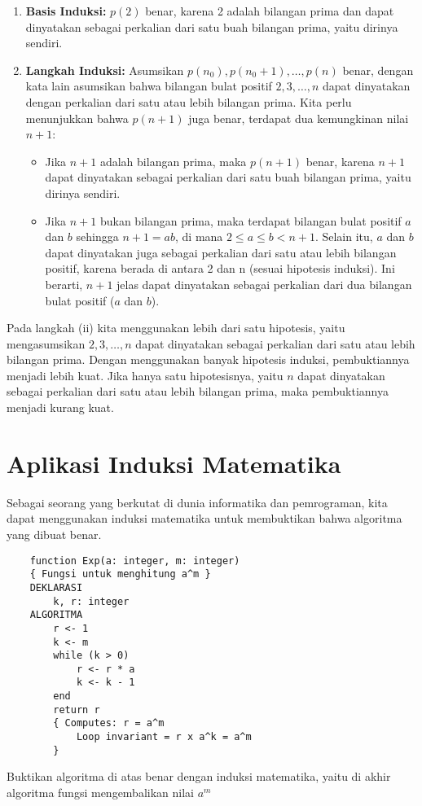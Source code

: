 \documentclass[11pt]{article}
\theoremstyle{definitionstyle}
\theoremstyle{theoremstyle}
\theoremstyle{examplestyle}
\begin{document}
\begin{enumerate}[left=0pt, itemsep=1.5pt, topsep=1.5pt, label=\roman*), leftmargin=1.5em]
    \item \textbf{Basis Induksi:} $p(2)$ benar, karena 2 adalah bilangan prima dan dapat dinyatakan sebagai perkalian dari satu buah bilangan prima, yaitu dirinya sendiri.
    \item \textbf{Langkah Induksi: } Asumsikan $p(n_0), p(n_0 + 1), \dots, p(n)$ benar, dengan kata lain asumsikan bahwa bilangan bulat positif $2, 3, \dots, n$ dapat dinyatakan dengan perkalian dari satu atau lebih bilangan prima. Kita perlu menunjukkan bahwa $p(n + 1)$ juga benar, terdapat dua kemungkinan nilai $n+1$:
    \begin{itemize}[left=0pt, itemsep=1.5pt, topsep=1.5pt, leftmargin=1.5em]
        \item Jika $n + 1$ adalah bilangan prima, maka $p(n + 1)$ benar, karena $n + 1$ dapat dinyatakan sebagai perkalian dari satu buah bilangan prima, yaitu dirinya sendiri.
        \item Jika $n + 1$ bukan bilangan prima, maka terdapat bilangan bulat positif $a$ dan $b$ sehingga $n + 1 = ab$, di mana $2 \leq a \leq b < n + 1$. Selain itu, $a$ dan $b$ dapat dinyatakan juga sebagai perkalian dari satu atau lebih bilangan positif, karena berada di antara 2 dan n (sesuai hipotesis induksi). Ini berarti, $n + 1$ jelas dapat dinyatakan sebagai perkalian dari dua bilangan bulat positif ($a$ dan $b$). \\
    \end{itemize}
\end{enumerate}
Pada langkah (ii) kita menggunakan lebih dari satu hipotesis, yaitu mengasumsikan $2, 3, \dots, n$ dapat dinyatakan sebagai perkalian dari satu atau lebih bilangan prima. Dengan menggunakan banyak hipotesis induksi, pembuktiannya menjadi lebih kuat. Jika hanya satu hipotesisnya, yaitu $n$ dapat dinyatakan sebagai perkalian dari satu atau lebih bilangan prima, maka pembuktiannya menjadi kurang kuat. \\

\section{Aplikasi Induksi Matematika}
Sebagai seorang yang berkutat di dunia informatika dan pemrograman, kita dapat menggunakan induksi matematika untuk membuktikan bahwa algoritma yang dibuat benar.

\begin{example} \hfill
\begin{lstlisting}
    function Exp(a: integer, m: integer)
    { Fungsi untuk menghitung a^m }
    DEKLARASI
        k, r: integer
    ALGORITMA
        r <- 1
        k <- m
        while (k > 0)
            r <- r * a
            k <- k - 1
        end
        return r
        { Computes: r = a^m
            Loop invariant = r x a^k = a^m
        }
\end{lstlisting}
    Buktikan algoritma di atas benar dengan induksi matematika, yaitu di akhir algoritma fungsi mengembalikan nilai $a^m$
\end{example}
\end{document}
